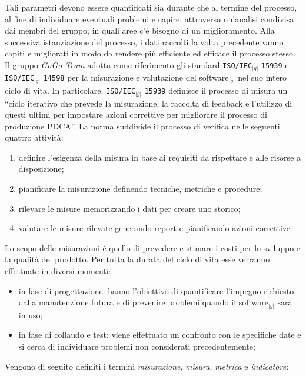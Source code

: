 {{	Tali parametri devono essere quantificati sia durante che al termine del processo, al fine di individuare eventuali problemi e capire, 
	attraverso un'analisi condivisa dai membri del gruppo, in quali aree c'è bisogno di un miglioramento. 
	Alla successiva istanziazione del processo, i dati raccolti la volta precedente vanno capiti e migliorati in modo da rendere più 
	efficiente ed efficace il processo stesso.\\

	Il gruppo \textit{GoGo Team} adotta come riferimento gli standard \texttt{ISO/IEC}$_{|g|}$ \texttt{15939} e 
	\texttt{ISO/IEC}$_{|g|}$ \texttt{14598} per la misurazione e valutazione del software$_{|g|}$ nel suo intero ciclo di vita. 
	In particolare, \texttt{ISO/IEC}$_{|g|}$ \texttt{15939} definisce il processo di misura un ``ciclo iterativo che prevede la misurazione, 
	la raccolta di feedback e l’utilizzo di questi ultimi per impostare azioni correttive per migliorare il processo di produzione PDCA''. 
	La norma suddivide il processo di verifica nelle seguenti quattro attività:
	\begin{enumerate}
		\item definire l’esigenza della misura in base ai requisiti da rispettare e alle risorse a disposizione;
		\item pianificare la misurazione definendo tecniche, metriche e procedure;
		\item rilevare le misure memorizzando i dati per creare uno storico;
		\item valutare le misure rilevate generando report e pianificando azioni correttive.
	\end{enumerate}
	Lo scopo delle misurazioni è quello di prevedere e stimare i costi per lo sviluppo e la qualità del prodotto. 
	Per tutta la durata del ciclo di vita esse verranno effettuate in diversi momenti:
	\begin{itemize}
		\item in fase di progettazione: hanno l’obiettivo di quantificare l’impegno richiesto dalla manutenzione futura e di prevenire 
		      problemi quando il software$_{|g|}$ sarà in uso; 
		\item in fase di collaudo e test: viene effettuato un confronto con le specifiche date e si cerca di individuare problemi non 
		      considerati precedentemente;
	\end{itemize}
	Vengono di seguito definiti i termini \textit{misurazione}, \textit{misura}, \textit{metrica} e \textit{indicatore}:
	\begin{itemize}

\end{itemize}}}
